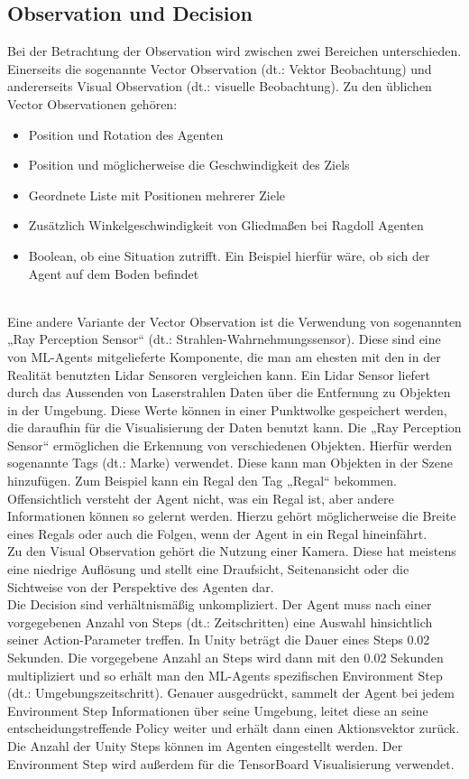 \subsection{Observation und Decision}
\label{observation}
Bei der Betrachtung der Observation wird zwischen zwei Bereichen unterschieden. Einerseits die sogenannte Vector Observation (dt.: Vektor Beobachtung) und andererseits Visual Observation (dt.: visuelle Beobachtung). Zu den üblichen Vector Observationen gehören:
\\
\begin{itemize}
	\item Position und Rotation des Agenten
	\item Position und möglicherweise die Geschwindigkeit des Ziels
	\item Geordnete Liste mit Positionen mehrerer Ziele
	\item Zusätzlich Winkelgeschwindigkeit von Gliedmaßen bei Ragdoll Agenten
	\item Boolean, ob eine Situation zutrifft. Ein Beispiel hierfür wäre, ob sich der Agent auf dem Boden befindet
\end{itemize}
\noindent
\\
Eine andere Variante der Vector Observation ist die Verwendung von sogenannten „Ray Perception Sensor“ (dt.: Strahlen-Wahrnehmungssensor). Diese sind eine von ML-Agents mitgelieferte Komponente, die man am ehesten mit den in der Realität benutzten Lidar Sensoren vergleichen kann. Ein Lidar Sensor liefert durch das Aussenden von Laserstrahlen Daten über die Entfernung zu Objekten in der Umgebung. Diese Werte können in einer Punktwolke gespeichert werden, die daraufhin für die Visualisierung der Daten benutzt kann. Die „Ray Perception Sensor“ ermöglichen die Erkennung von verschiedenen Objekten. Hierfür werden sogenannte Tags (dt.: Marke) verwendet. Diese kann man Objekten in der Szene hinzufügen. Zum Beispiel kann ein Regal den Tag „Regal“ bekommen. Offensichtlich versteht der Agent nicht, was ein Regal ist, aber andere Informationen können so gelernt werden. Hierzu gehört möglicherweise die Breite eines Regals oder auch die Folgen, wenn der Agent in ein Regal hineinfährt.  
\\
Zu den Visual Observation gehört die Nutzung einer Kamera. Diese hat meistens eine niedrige Auflösung und stellt eine Draufsicht, Seitenansicht oder die Sichtweise von der Perspektive des Agenten dar. 
\\
Die Decision sind verhältnismäßig unkompliziert. Der Agent muss nach einer vorgegebenen Anzahl von Steps (dt.: Zeitschritten) eine Auswahl hinsichtlich seiner Action-Parameter treffen. In Unity beträgt die Dauer eines Steps 0.02 Sekunden. Die vorgegebene Anzahl an Steps wird dann mit den 0.02 Sekunden multipliziert und so erhält man den ML-Agents spezifischen Environment Step (dt.: Umgebungszeitschritt). Genauer ausgedrückt, sammelt der Agent bei jedem Environment Step Informationen über seine Umgebung, leitet diese an seine entscheidungstreffende Policy weiter und erhält dann einen Aktionsvektor zurück. Die Anzahl der Unity Steps können im Agenten eingestellt werden. Der Environment Step wird außerdem für die TensorBoard Visualisierung verwendet.

